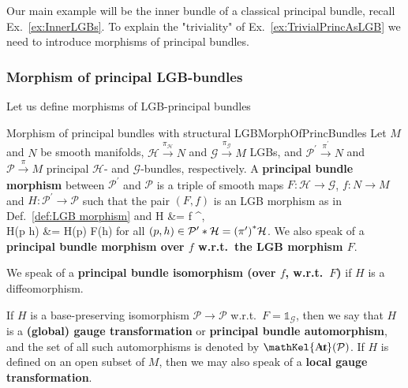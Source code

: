 \documentclass[a4paper,oneside,11pt,bibliography=totoc]{scrartcl}
\DeclareMathOperator{\sAut}{\mathKel{A\mkern-5.5mu u\mkern-4mu t\mkern-1.5mu}}
\def\ba#1\ea{\begin{align}#1\end{align}}
\theoremstyle{plain}
\theoremstyle{remark}
\theoremstyle{definition}
\begin{document}
Our main example will be the inner bundle of a classical principal bundle, recall Ex.\ \ref{ex:InnerLGBs}. To explain the "triviality" of Ex.\ \ref{ex:TrivialPrincAsLGB} we need to introduce morphisms of principal bundles.

\subsubsection{Morphism of principal LGB-bundles}

Let us define morphisms of LGB-principal bundles

\begin{definitions}{Morphism of principal bundles with structural LGB}{MorphOfPrincBundles}
Let $M$ and $N$ be smooth manifolds, $\mathcal{H} \stackrel{\pi_{\mathcal{H}}}{\to} N$ and $\mathcal{G} \stackrel{\pi_{\mathcal{G}}}{\to} M$ LGBs, and $\mathcal{P}^\prime \stackrel{\pi^\prime}{\to} N$ and $\mathcal{P} \stackrel{\pi}{\to} M$ principal $\mathcal{H}$- and $\mathcal{G}$-bundles, respectively. A \textbf{principal bundle morphism} between $\mathcal{P}^\prime$ and $\mathcal{P}$ is a triple of smooth maps $F: \mathcal{H} \to \mathcal{G}$, $f: N \to M$ and $H: \mathcal{P}^\prime \to \mathcal{P}$ such that the pair $(F, f)$ is an LGB morphism as in Def.\ \ref{def:LGB morphism} and
\ba
\pi \circ H &= f \circ \pi^\prime,\label{PrincMorphoverBaseMap}\\
H(p \cdot h) &= H(p) \cdot F(h)\label{PrincMorphLGBEquiv}
\ea
for all $(p, h) \in \mathcal{P}^\prime * \mathcal{H} = \mleft(\pi^\prime\mright)^*\mathcal{H}$. We also speak of a \textbf{principal bundle morphism over $f$ w.r.t.\ the LGB morphism $F$}.

We speak of a \textbf{principal bundle isomorphism (over $f$, w.r.t.\ $F$)} if $H$ is a diffeomorphism. 

If $H$ is a base-preserving isomorphism $\mathcal{P} \to \mathcal{P}$ w.r.t.\ $F = \mathds{1}_{\mathcal{G}}$, then we say that $H$ is a \textbf{(global) gauge transformation} or \textbf{principal bundle automorphism}, and the set of all such automorphisms is denoted by $\sAut(\mathcal{P})$. If $H$ is defined on an open subset of $M$, then we may also speak of a \textbf{local gauge transformation}.
\end{definitions}
\end{document}
